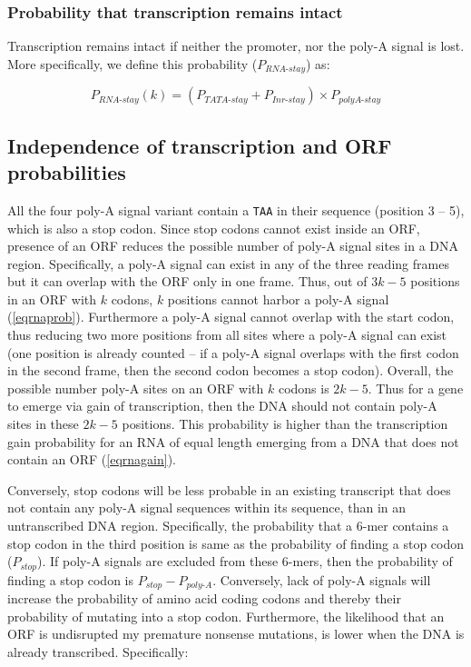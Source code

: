 \documentclass[12pt,a4paper]{article}
\begin{document}
\subsubsection{Probability that transcription remains intact}

Transcription remains intact if neither the promoter, nor the poly-A signal is lost. More specifically, we define this probability ($P_\textit{RNA-stay}$) as:

\begin{equation}
P_\textit{RNA-stay}(k) = (P_\textit{TATA-stay} + P_\textit{Inr-stay}) \times P_\textit{polyA-stay}
\label{eqrnastay}
\end{equation}

\subsection{Independence of transcription and ORF probabilities}

\label{rnaorfindependence}

All the four poly-A signal variant contain a \texttt{TAA} in their sequence (position 3 -- 5), which is also a stop codon. Since stop codons cannot exist inside an ORF, presence of an ORF reduces the possible number of poly-A signal sites in a DNA region. Specifically, a poly-A signal can exist in any of the three reading frames but it can overlap with the ORF only in one frame. Thus, out of $3k-5$ positions in an ORF with $k$ codons, $k$ positions cannot harbor a poly-A signal (\autoref{eqrnaprob}). Furthermore a poly-A signal cannot overlap with the start codon, thus reducing two more positions from all sites where a poly-A signal can exist (one position is already counted -- if a poly-A signal overlaps with the first codon in the second frame, then the second codon becomes a stop codon). Overall, the possible number poly-A sites on an ORF with $k$ codons is $2k-5$. Thus for a gene to emerge via gain of transcription, then the DNA should not contain poly-A sites in these $2k-5$ positions. This probability is higher than the transcription gain probability for an RNA of equal length emerging from a DNA that does not contain an ORF (\autoref{eqrnagain}).

Conversely, stop codons will be less probable in an existing transcript that does not contain any poly-A signal sequences within its sequence, than in an untranscribed DNA region. Specifically, the probability that a 6-mer contains a stop codon in the third position is same as the probability of finding a stop codon ($P_\textit{stop}$). If poly-A signals are excluded from these 6-mers, then the probability of finding a stop codon is $P_\textit{stop} - P_\textit{poly-A}$. Conversely, lack of poly-A signals will increase the probability of amino acid coding codons and thereby their probability of mutating into a stop codon. Furthermore, the likelihood that an ORF is undisrupted my premature nonsense mutations, is lower when the DNA is already transcribed. Specifically:
\end{document}
